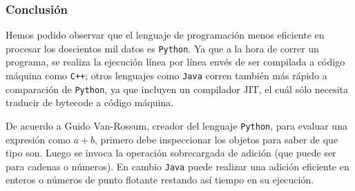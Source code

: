 \subsubsection*{Conclusión}
Hemos podido observar que el lenguaje de programación menos eficiente en procesar los doscientos mil datos es \verb!Python!. Ya que a la hora de correr un programa, se realiza la ejecución línea por línea envés de ser compilada a código máquina como \verb!C++!; otros lenguajes como \verb!Java! corren también más rápido a comparación de \verb!Python!, ya que incluyen un compilador JIT, el cuál sólo necesita traducir de bytecode a código máquina.

De acuerdo a Guido Van-Rossum, creador del lenguaje \verb!Python!, para evaluar una expresión como $a+b$, primero debe inspeccionar los objetos para saber de que tipo son. Luego se invoca la operación sobrecargada de adición (que puede ser para cadenas o números). En cambio \verb!Java! puede realizar una adición eficiente en enteros o números de punto flotante restando así tiempo en su ejecución.\cite{guido}

